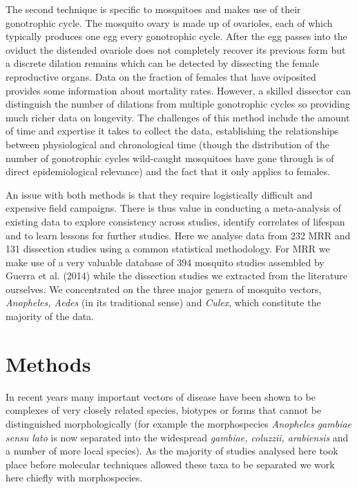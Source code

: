 \documentclass[]{article}
\begin{document}
The second technique is specific to mosquitoes and makes use of their
gonotrophic cycle. The mosquito ovary is made up of ovarioles, each of
which typically produces one egg every gonotrophic cycle. After the egg
passes into the oviduct the distended ovariole does not completely
recover its previous form but a discrete dilation remains which can be
detected by dissecting the female reproductive organs. Data on the
fraction of females that have oviposited provides some information about
mortality rates. However, a skilled dissector can distinguish the number
of dilations from multiple gonotrophic cycles so providing much richer
data on longevity. The challenges of this method include the amount of
time and expertise it takes to collect the data, establishing the
relationships between physiological and chronological time (though the
distribution of the number of gonotrophic cycles wild-caught mosquitoes
have gone through is of direct epidemiological relevance) and the fact
that it only applies to females.

An issue with both methods is that they require logistically difficult
and expensive field campaigns. There is thus value in conducting a
meta-analysis of existing data to explore consistency across studies,
identify correlates of lifespan and to learn lessons for further
studies. Here we analyse data from 232 MRR and 131 dissection studies
using a common statistical methodology. For MRR we make use of a very
valuable database of 394 mosquito studies assembled by Guerra et al.
(2014) while the dissection studies we extracted from the literature
ourselves. We concentrated on the three major genera of mosquito
vectors, \emph{Anopheles, Aedes} (in its traditional sense) and
\emph{Culex}, which constitute the majority of the data.

\section{Methods}\label{methods}

In recent years many important vectors of disease have been shown to be
complexes of very closely related species, biotypes or forms that cannot
be distinguished morphologically (for example the morphospecies
\emph{Anopheles gambiae sensu lato} is now separated into the widespread
\emph{gambiae, coluzzii, arabiensis} and a number of more local
species). As the majority of studies analysed here took place before
molecular techniques allowed these taxa to be separated we work here
chiefly with morphospecies.
\end{document}
